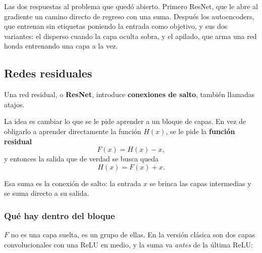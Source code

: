 \documentclass[11pt,letterpaper]{article}
\begin{document}

\begin{quick_sum}
    Las dos respuestas al problema que quedó abierto. Primero ResNet,
    que le abre al gradiente un camino directo de regreso con una
    suma. Después los autoencoders, que entrenan sin etiquetas
    poniendo la entrada como objetivo, y sus dos variantes: el disperso
    cuando la capa oculta sobra, y el apilado, que arma una red honda
    entrenando una capa a la vez.
\end{quick_sum}

\subsection*{Redes residuales}

Una red residual, o \textbf{ResNet}, introduce \textbf{conexiones de
salto}, también llamadas atajos.

La idea es cambiar lo que se le pide aprender a un bloque de capas. En
vez de obligarlo a aprender directamente la función $H(x)$, se le pide
la \textbf{función residual}
\[
    F(x) = H(x) - x ,
\]
y entonces la salida que de verdad se busca queda
\[
    H(x) = F(x) + x .
\]

Esa suma es la conexión de salto: la entrada $x$ se brinca las capas
intermedias y se suma directo a su salida.

\subsubsection*{Qué hay dentro del bloque}

$F$ no es una capa suelta, es un grupo de ellas. En la versión clásica
son dos capas convolucionales con una ReLU en medio, y la suma va
\emph{antes} de la última ReLU:

\begin{center}
\end{center}
\end{document}
